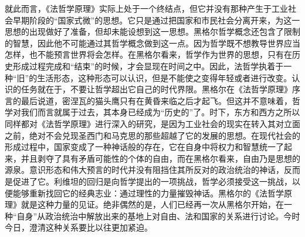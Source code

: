 就此而言，《法哲学原理》实际上处于一个终结点，但它并没有那种产生于工业社会早期阶段的“国家式微”的思想。它只是通过把国家和市民社会分离开来，为这一思想的出现做好了准备，但却未能设想到这一思想。黑格尔哲学概念还包含了限制的智慧，因此他不可能通过其哲学概念做到这一点。因为哲学既不想教导世界应当怎样，也不能预言世界将会怎样。在黑格尔看来，哲学作为世界的思想，只有在历史形成过程完成和“结束”的时候，才会显现在时间之中。因此，法哲学执着于一种“旧”的生活形态，这种形态可以认识，但是不能使之变得年轻或者进行改变。认识的任务就在于，不要让哲学超出它自己的时代界限。黑格尔在《法哲学原理》序言的最后说道，密涅瓦的猫头鹰只有在黄昏来临之后才起飞。但这并不意味着，哲学对我们而言就属于过去，其本身已经成为“历史的”了。时下，东方和西方之所以同样都对《法哲学原理》进行深入的研究，是因为工业社会的现实在转入其对立面之前，绝对不会兑现圣西门和马克思的那些超越了它的发展的思想。在现代社会的形成过程中，国家变成了一种神话般的存在，它在自身中将权力和智慧统一了起来，并且剥夺了具有矛盾可能性的个体的自由，而在黑格尔看来，自由乃是思想的源泉。意识形态和伟大预言的时代并没有阻挡住其所反对的政治统治的神话，反而是促进了它。利维坦的回归是向哲学提出的一项挑战，哲学必须接受这一挑战，以便能够重新找回它的经典志业：通过理性的力量摧毁神话。黑格尔的《法哲学原理》就是这种力量的见证。绝非偶然的是，人们已经再一次从黑格尔开始，在一种“自身”从政治统治中解放出来的基地上对自由、法和国家的关系进行讨论。今时今日，澄清这种关系要比以往更加紧迫。
